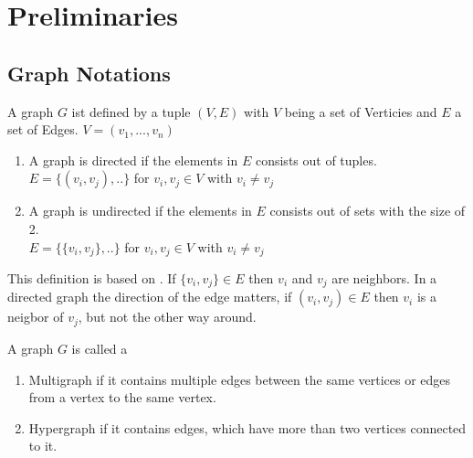 \chapter{Preliminaries}
\label{Preliminaries}
\section{Graph Notations}
\begin{mydef}
A graph $G$ ist defined by a tuple $(V,E)$ with $V$ being a set of Verticies and $E$ a set of Edges.
$V = (v_{1}, ..., v_{n})$
\begin{enumerate}
 \item A graph is directed if the elements in $E$ consists out of tuples.\\
 $E = \{(v_{i},v_{j}),..\}$ for $v_{i},v_{j} \in V$ with $v_{i} \neq v_{j}$
 \item A graph is undirected if the elements in $E$ consists out of sets with the size of 2.\\
 $E = \{\{v_{i},v_{j}\},..\}$ for $v_{i},v_{j} \in V$ with $v_{i} \neq v_{j}$
\end{enumerate}
\end{mydef}
This definition is based on \cite{Diestel.2012}. If $\{v_{i},v_{j}\} \in E$ then $v_{i}$ and $v_{j}$ are neighbors. In a directed graph the direction of the edge matters, if $(v_{i},v_{j}) \in E$ then $v_{i}$ is a neigbor of $v_{j}$, but not the other way around.
\begin{mydef}
A graph $G$ is called a
\begin{enumerate}
 \item Multigraph if it contains multiple edges between the same vertices or edges from a vertex to the same vertex.
 \item Hypergraph if it contains edges, which have more than two vertices connected to it.
\end{enumerate}
\end{mydef}
